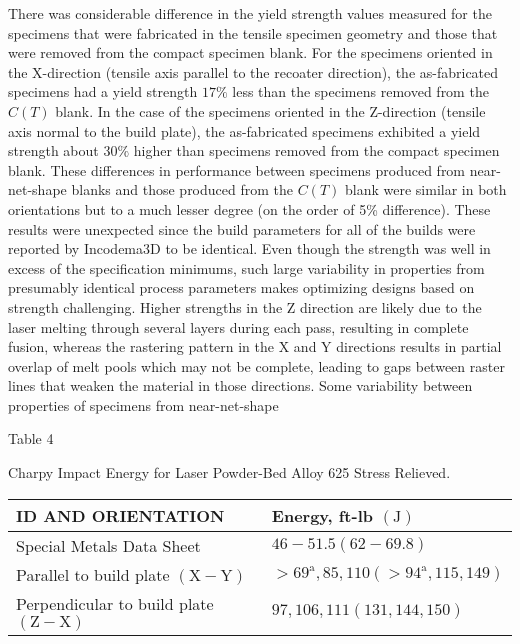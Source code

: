 \documentclass[10pt]{article}
\begin{document}
There was considerable difference in the yield strength values measured for the specimens that were fabricated in the tensile specimen geometry and those that were removed from the compact specimen blank. For the specimens oriented in the X-direction (tensile axis parallel to the recoater direction), the as-fabricated specimens had a yield strength $17 \%$ less than the specimens removed from the $C(T)$ blank. In the case of the specimens oriented in the Z-direction (tensile axis normal to the build plate), the as-fabricated specimens exhibited a yield strength about $30 \%$ higher than specimens removed from the compact specimen blank. These differences in performance between specimens produced from near-net-shape blanks and those produced from the $C(T)$ blank were similar in both orientations but to a much lesser degree (on the order of 5\% difference). These results were unexpected since the build parameters for all of the builds were reported by Incodema3D to be identical. Even though the strength was well in excess of the specification minimums, such large variability in properties from presumably identical process parameters makes optimizing designs based on strength challenging. Higher strengths in the $\mathrm{Z}$ direction are likely due to the laser melting through several layers during each pass, resulting in complete fusion, whereas the rastering pattern in the $\mathrm{X}$ and $\mathrm{Y}$ directions results in partial overlap of melt pools which may not be complete, leading to gaps between raster lines that weaken the material in those directions. Some variability between properties of specimens from near-net-shape

Table 4

Charpy Impact Energy for Laser Powder-Bed Alloy 625 Stress Relieved.

\begin{center}
\begin{tabular}{ll}
\hline
ID AND ORIENTATION & Energy, ft-lb $(\mathrm{J})$ \\
\hline
Special Metals Data Sheet & $46-51.5(62-69.8)$ \\
Parallel to build plate $(\mathrm{X}-\mathrm{Y})$ & $>69^{\mathrm{a}}, 85,110\left(>94^{\mathrm{a}}, 115,149\right)$ \\
Perpendicular to build plate $(\mathrm{Z}-\mathrm{X})$ & $97,106,111(131,144,150)$ \\
\hline
\end{tabular}
\end{center}
\end{document}
